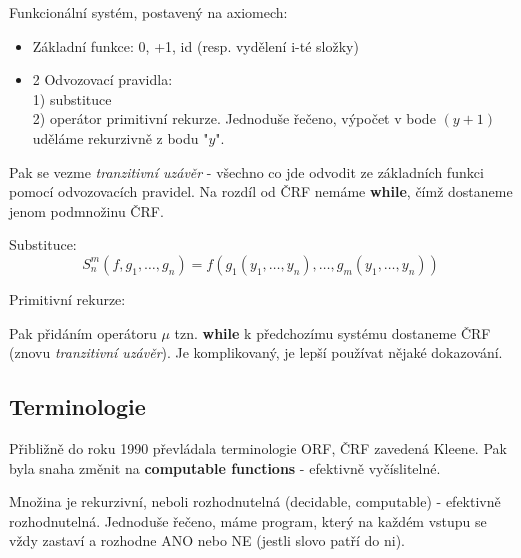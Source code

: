 \begin{note}
	Funkcionální systém, postavený na axiomech:
	\begin{itemize}
		\item Základní funkce: 0, +1, id (resp. vydělení i-té složky)
		\item 2 Odvozovací pravidla:\\
			1) substituce \\
			2) operátor primitivní rekurze.
			Jednoduše řečeno, výpočet v bode $(y + 1)$ uděláme rekurzivně z bodu "$y$".
	\end{itemize}

	Pak se vezme \emph{tranzitivní uzávěr} - všechno co jde odvodit ze základních funkci pomocí odvozovacích pravidel.
	Na rozdíl od ČRF nemáme \textbf{while}, čímž dostaneme jenom podmnožinu ČRF.

	Substituce:
	\[ S_n^m(f, g_1, \ldots, g_n) = f(g_1(y_1, \ldots, y_n), \ldots, g_m(y_1, \ldots, y_n)) \]

	Primitivní rekurze:

\end{note}

\begin{note}
	Pak přidáním operátoru $\mu$ tzn. \textbf{while} k předchozímu systému dostaneme ČRF (znovu \emph{tranzitivní uzávěr}).
	Je komplikovaný, je lepší používat nějaké dokazování.
\end{note}


\subsection{Terminologie}

Přibližně do roku 1990 převládala terminologie ORF, ČRF zavedená Kleene.
Pak byla snaha změnit na \textbf{computable functions} - efektivně vyčíslitelné.
\begin{definition}
	Množina je rekurzivní, neboli rozhodnutelná (decidable, computable) - efektivně rozhodnutelná.
	Jednoduše řečeno, máme program, který na každém vstupu se vždy zastaví a rozhodne ANO nebo NE (jestli slovo patří do ni).
\end{definition}

